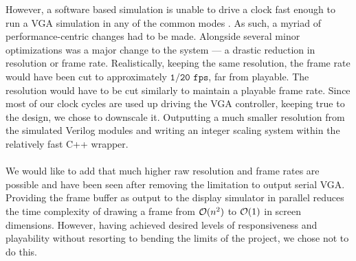 However, a software based simulation is unable to drive a clock fast enough
to run a VGA simulation in any of the common modes \cite{vga_modes}. As such,
a myriad of performance-centric changes had to be made. Alongside several
minor optimizations was a major change to the system --- a drastic reduction in
resolution or frame rate. Realistically, keeping the same resolution, the frame 
rate would have been cut to approximately \(\texttt{1/20 fps}\), far from playable.
The resolution would have to be cut similarly to maintain a playable frame rate.
Since most of our clock cycles are used up driving the VGA controller, keeping true
to the design, we chose to downscale it. Outputting a much smaller resolution from
the simulated Verilog modules and writing an integer scaling \cite{intscale} system
within the relatively fast C++ wrapper. 
\\ \\
We would like to add that much higher raw resolution and frame rates are possible 
and have been seen after removing the limitation to output serial VGA. Providing
the frame buffer as output to the display simulator in parallel reduces the time
complexity of drawing a frame from \(\mathcal{O} (n^2)\) to \(\mathcal{O} (1)\) in screen 
dimensions. However, having achieved desired levels of responsiveness and 
playability without resorting to bending the limits of the project, we chose not 
to do this.
